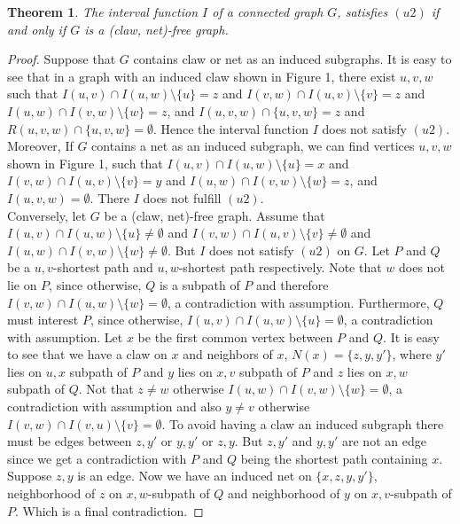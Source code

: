 \documentclass[10pt,a4paper]{article}
\newtheorem{theorem}{Theorem}
\begin{document}
\begin{theorem}
The interval function $I$ of a connected graph $G$, satisfies $(u2)$ if and only if $G$ is a (claw, net)-free graph.
\end{theorem}
\begin{proof}
Suppose that $G$ contains claw or net as an induced subgraphs. It is easy to see that in a graph with an induced claw shown in Figure 1, there exist $u,v,w$ such that $I(u,v)\cap I(u,w)\setminus \{u\}=z$ and $I(v,w)\cap I(u,v)\setminus \{v\}=z$ and $I(u,w)\cap I(v,w)\setminus \{w\}=z$, and $I(u,v,w)\cap \{u,v,w\}=z$ and $R(u,v,w)\cap \{u,v,w\}=\emptyset$. Hence the interval function $I$ does not satisfy $(u2)$. Moreover, If $G$ contains a net as an induced subgraph, we can find vertices $u,v,w$ shown in Figure 1, such that $I(u,v)\cap I(u,w)\setminus \{u\}=x$ and $I(v,w)\cap I(u,v)\setminus \{v\}=y$ and $I(u,w)\cap I(v,w)\setminus \{w\}=z$, and $I(u,v,w)=\emptyset$. There $I$ does not fulfill $(u2)$.\\
 
Conversely, let $G$ be a (claw, net)-free graph. Assume that $I(u,v)\cap I(u,w)\setminus \{u\}\neq\emptyset$ and $I(v,w)\cap I(u,v)\setminus \{v\}\neq\emptyset$ and $I(u,w)\cap I(v,w)\setminus \{w\}\neq\emptyset$. But $I$ does not satisfy $(u2)$ on $G$.
Let $P$ and $Q$ be a $u,v$-shortest path and $u,w$-shortest path respectively. Note that $w$ does not lie on $P$, since otherwise, $Q$ is a subpath of $P$ and therefore $I(v,w)\cap I(u,w)\setminus \{w\}=\emptyset$, a contradiction with assumption. Furthermore, $Q$ must interest $P$, since otherwise, $I(u,v)\cap I(u,w)\setminus \{u\}=\emptyset$, a contradiction with assumption. Let $x$ be the first common vertex between $P$ and $Q$. It is easy to see that we have a claw on $x$ and neighbors of $x$, $N(x)=\{z,y,y'\}$, where $y'$ lies on $u,x$ subpath of $P$ and $y$ lies on $x,v$ subpath of $P$ and $z$ lies on $x,w$ subpath of $Q$. Not that $z\neq w$ otherwise $I(u,w)\cap I(v,w)\setminus \{w\}=\emptyset$, a contradiction with assumption and also $y\neq v$ otherwise $I(v,w)\cap I(v,u)\setminus \{v\}=\emptyset$. To avoid having a claw an induced subgraph there must be edges between $z,y'$ or $y,y'$ or $z,y$. But $z,y'$ and $y,y'$ are not an edge since we get a contradiction with $P$ and $Q$ being the shortest path containing $x$. Suppose $z,y$ is an edge. Now we have an induced net on $\{x,z,y,y'\}$, neighborhood of $z$ on $x,w$-subpath of $Q$ and neighborhood of $y$ on $x,v$-subpath of $P$. Which is a final contradiction.
 
\end{proof}
\end{document}
